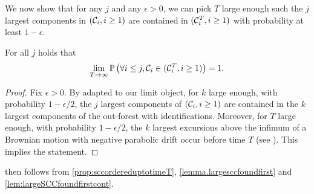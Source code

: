 We now show that for any $j$ and any $\epsilon>0$, we can pick $T$ large enough such the $j$ largest components in $({\mathcal C}_i,i\geq 1)$ are contained in $({\mathcal C}^T_i,i \geq 1)$ with probability at least $1-\epsilon$.

\begin{lemma}\label{lem:largeSCCfoundfirstcont}
For all $j$ holds that 
$$\lim_{T\to\infty}{\mathbb P}\left(\forall i\leq j, {\mathcal C}_i\in ({\mathcal C}^T_i,i \geq 1)\right)=1.$$
\end{lemma}
\begin{proof}
Fix $\epsilon>0$. By \cite[Proposition 5.10]{goldschmidtScalingLimitCritical2019} adapted to our limit object, for $k$ large enough, with probability $1-\epsilon/2$, the $j$ largest components of $({\mathcal C}_i,i\geq 1)$ are contained in the $k$ largest components of the out-forest with identifications. Moreover, for $T$ large enough, with probability $1-\epsilon/2$, the $k$ largest excursions above the infimum of a Brownian motion with negative parabolic drift occur before time $T$  (see \cite[Section 3]{aldousBrownianExcursionsCritical1997}). This implies the statement.
\end{proof}
 then follows from \cref{prop:sccordereduptotimeT}, \cref{lemma.largesccfoundfirst} and \cref{lem:largeSCCfoundfirstcont}.



